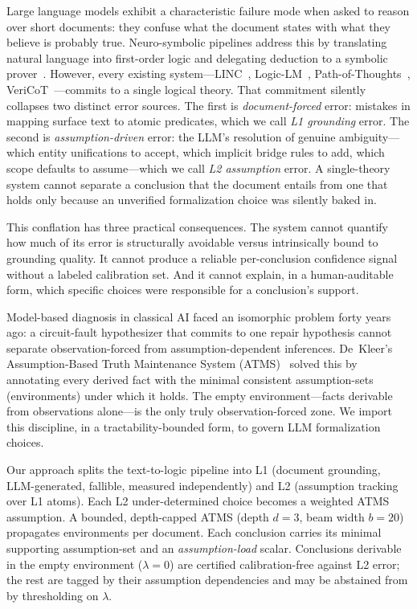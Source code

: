 \documentclass[11pt,letterpaper]{article}
\begin{document}
Large language models exhibit a characteristic failure mode when asked to reason over short documents:
they confuse what the document states with what they believe is probably true. Neuro-symbolic pipelines
address this by translating natural language into first-order logic and delegating deduction to a
symbolic prover~\citep{Olausson2023, Pan2023}. However, every existing system---LINC~\citep{Olausson2023},
Logic-LM~\citep{Pan2023}, Path-of-Thoughts~\citep{Zhang2024}, VeriCoT~\citep{Feng2025}---commits to a
single logical theory. That commitment silently collapses two distinct error sources. The first is
\emph{document-forced} error: mistakes in mapping surface text to atomic predicates, which we call
\emph{L1 grounding} error. The second is \emph{assumption-driven} error: the LLM's resolution of
genuine ambiguity---which entity unifications to accept, which implicit bridge rules to add, which
scope defaults to assume---which we call \emph{L2 assumption} error. A single-theory system cannot
separate a conclusion that the document entails from one that holds only because an unverified
formalization choice was silently baked in.

This conflation has three practical consequences. The system cannot quantify how much of its error is
structurally avoidable versus intrinsically bound to grounding quality. It cannot produce a reliable
per-conclusion confidence signal without a labeled calibration set. And it cannot explain, in a
human-auditable form, which specific choices were responsible for a conclusion's support.

Model-based diagnosis in classical AI faced an isomorphic problem forty years ago: a circuit-fault
hypothesizer that commits to one repair hypothesis cannot separate observation-forced from
assumption-dependent inferences. De~Kleer's Assumption-Based Truth Maintenance System
(ATMS)~\citep{deKleer1986} solved this by annotating every derived fact with the minimal consistent
assumption-sets (environments) under which it holds. The empty environment---facts derivable from
observations alone---is the only truly observation-forced zone. We import this discipline, in a
tractability-bounded form, to govern LLM formalization choices.

Our approach splits the text-to-logic pipeline into L1 (document grounding, LLM-generated, fallible,
measured independently) and L2 (assumption tracking over L1 atoms). Each L2 under-determined choice
becomes a weighted ATMS assumption. A bounded, depth-capped ATMS (depth $d=3$, beam width $b=20$)
propagates environments per document. Each conclusion carries its minimal supporting assumption-set
and an \emph{assumption-load} scalar. Conclusions derivable in the empty environment ($\lambda=0$) are
certified calibration-free against L2 error; the rest are tagged by their assumption dependencies and
may be abstained from by thresholding on $\lambda$.
\end{document}
